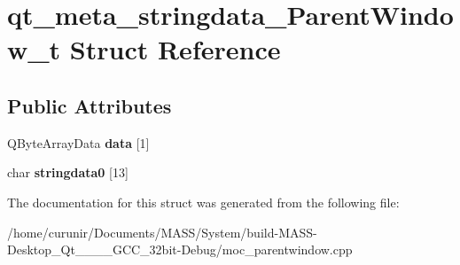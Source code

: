\hypertarget{structqt__meta__stringdata___parent_window__t}{}\section{qt\+\_\+meta\+\_\+stringdata\+\_\+\+Parent\+Window\+\_\+t Struct Reference}
\label{structqt__meta__stringdata___parent_window__t}
\subsection*{Public Attributes}
\begin{DoxyCompactItemize}
\item 
Q\+Byte\+Array\+Data {\bfseries data} \mbox{[}1\mbox{]}\hypertarget{structqt__meta__stringdata___parent_window__t_afab90f05f6130401ec3a3f4848f435f8}{}\label{structqt__meta__stringdata___parent_window__t_afab90f05f6130401ec3a3f4848f435f8}

\item 
char {\bfseries stringdata0} \mbox{[}13\mbox{]}\hypertarget{structqt__meta__stringdata___parent_window__t_a0db0c40a6d8dd01716efd3b1ace240f2}{}\label{structqt__meta__stringdata___parent_window__t_a0db0c40a6d8dd01716efd3b1ace240f2}

\end{DoxyCompactItemize}


The documentation for this struct was generated from the following file\+:\begin{DoxyCompactItemize}
\item 
/home/curunir/\+Documents/\+M\+A\+S\+S/\+System/build-\/\+M\+A\+S\+S-\/\+Desktop\+\_\+\+Qt\+\_\+\_\+\_\+\_\+\+G\+C\+C\+\_\+32bit-\/\+Debug/moc\+\_\+parentwindow.\+cpp\end{DoxyCompactItemize}
